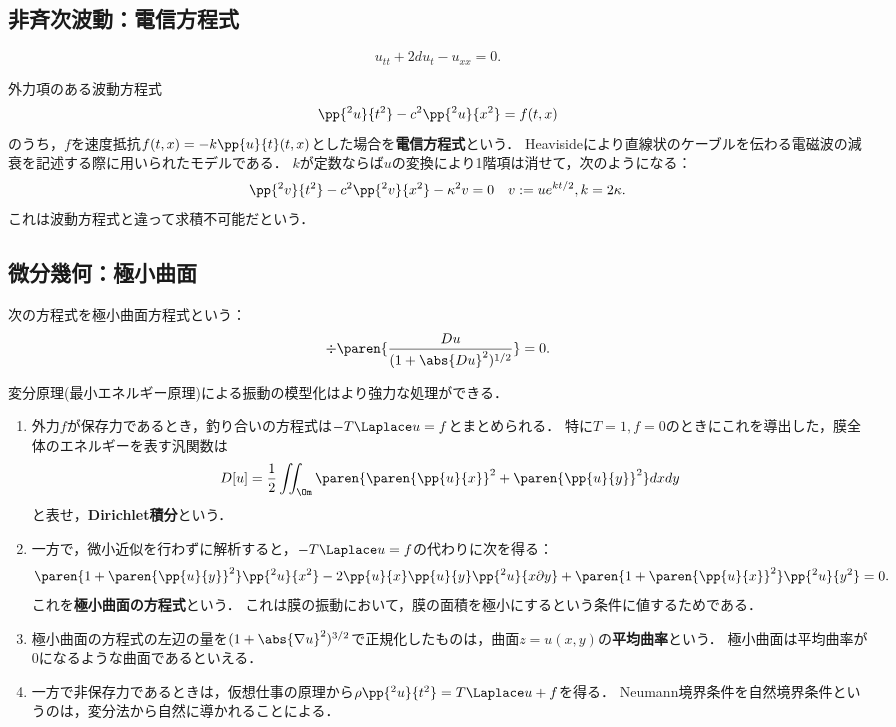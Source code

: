 \documentclass[uplatex,dvipdfmx]{jsreport}
\begin{document}
\subsection{非斉次波動：電信方程式}

\begin{model}
    \[u_{tt}+2du_t-u_{xx}=0.\]
\end{model}

\begin{example}[電信模型]
    外力項のある波動方程式
    \[\pp{^2u}{t^2}-c^2\pp{^2u}{x^2}=f(t,x)\]
    のうち，$f$を速度抵抗$f(t,x)=-k\pp{u}{t}(t,x)$とした場合を\textbf{電信方程式}という．
    Heavisideにより直線状のケーブルを伝わる電磁波の減衰を記述する際に用いられたモデルである．
    $k$が定数ならば$u$の変換により1階項は消せて，次のようになる：
    \[\pp{^2v}{t^2}-c^2\pp{^2v}{x^2}-\kappa^2v=0\quad v:=ue^{kt/2},k=2\kappa.\]
    これは波動方程式と違って求積不可能だという．
\end{example}

\subsection{微分幾何：極小曲面}

\begin{tcolorbox}[colframe=ForestGreen, colback=ForestGreen!10!white,breakable,colbacktitle=ForestGreen!40!white,coltitle=black,fonttitle=\bfseries\sffamily,
title=]
    次の方程式を極小曲面方程式という：
    \[\div\paren{\frac{Du}{(1+\abs{Du}^2)^{1/2}}}=0.\]
\end{tcolorbox}

\begin{model}[変分原理による模型]\label{model-plateau-problem}
    変分原理(最小エネルギー原理)による振動の模型化はより強力な処理ができる．
    \begin{enumerate}
        \item 外力$f$が保存力であるとき，釣り合いの方程式は$-T\Laplace u=f$とまとめられる．
        特に$T=1,f=0$のときにこれを導出した，膜全体のエネルギーを表す汎関数は
        \[D[u]=\frac{1}{2}\iint_\Om\paren{\paren{\pp{u}{x}}^2+\paren{\pp{u}{y}}^2}dxdy\]
        と表せ，\textbf{Dirichlet積分}という．
        \item 一方で，微小近似を行わずに解析すると，$-T\Laplace u=f$の代わりに次を得る：
        \[\paren{1+\paren{\pp{u}{y}}^2}\pp{^2u}{x^2}-2\pp{u}{x}\pp{u}{y}\pp{^2u}{x\partial y}+\paren{1+\paren{\pp{u}{x}}^2}\pp{^2u}{y^2}=0.\]
        これを\textbf{極小曲面の方程式}という．
        これは膜の振動において，膜の面積を極小にするという条件に値するためである．
        \item 極小曲面の方程式の左辺の量を$(1+\abs{\nabla u}^2)^{3/2}$で正規化したものは，曲面$z=u(x,y)$の\textbf{平均曲率}という．
        極小曲面は平均曲率が$0$になるような曲面であるといえる．
        \item 一方で非保存力であるときは，仮想仕事の原理から$\rho\pp{^2u}{t^2}=T\Laplace u+f$を得る．
        Neumann境界条件を自然境界条件というのは，変分法から自然に導かれることによる．
    \end{enumerate}
\end{model}
\end{document}
